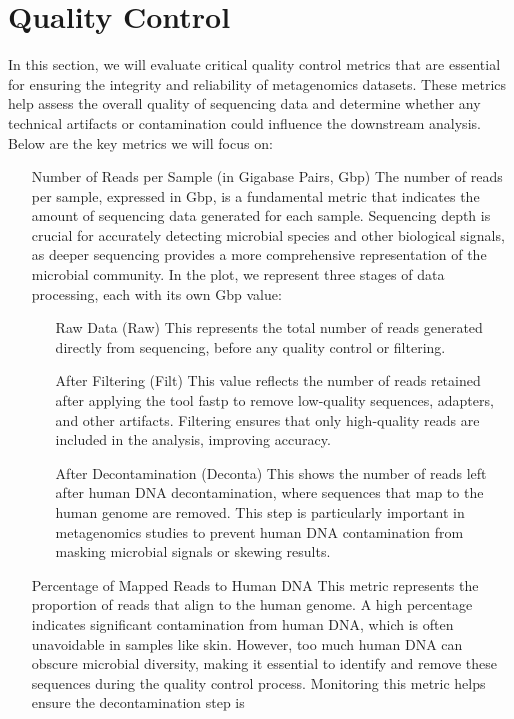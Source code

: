 \section{Quality Control}
In this section, we will evaluate critical quality control metrics that are essential for ensuring the integrity and reliability 
of metagenomics datasets. These metrics help assess the overall quality of sequencing data and determine whether any 
technical artifacts or contamination could influence the downstream analysis. Below are the key metrics we will focus on:
\begin{itemize}
    \item[Number of Reads per Sample (in Gigabase Pairs, Gbp)] The number of reads per sample, expressed in Gbp, is a 
    fundamental metric that indicates the amount of sequencing data generated for each sample. Sequencing depth is 
    crucial for accurately detecting microbial species and other biological signals, as deeper sequencing provides a more 
    comprehensive representation of the microbial community. In the plot, we represent three stages of data processing, 
    each with its own Gbp value:
    \begin{itemize}
        \item[Raw Data (Raw)] This represents the total number of reads generated directly from sequencing, before any 
        quality control or filtering.
        \item[After Filtering (Filt)] This value reflects the number of reads retained after applying the tool fastp to 
        remove low-quality sequences, adapters, and other artifacts. Filtering ensures that only high-quality reads are 
        included in the analysis, improving accuracy.
        \item[After Decontamination (Deconta)] This shows the number of reads left after human DNA decontamination, 
        where sequences that map to the human genome are removed. This step is particularly important in metagenomics 
        studies to prevent human DNA contamination from masking microbial signals or skewing results.
    \end{itemize}
    \item[Percentage of Mapped Reads to Human DNA] This metric represents the proportion of reads that align to the human 
    genome. A high percentage indicates significant contamination from human DNA, which is often unavoidable in samples 
    like skin. However, too much human DNA can obscure microbial diversity, making it essential to identify and remove 
    these sequences during the quality control process. Monitoring this metric helps ensure the decontamination step is 

\end{itemize}
